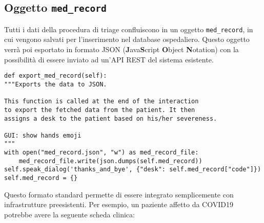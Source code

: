 \subsection{Oggetto \texttt{med\_record}}
Tutti i dati della procedura di triage confluiscono in un oggetto \texttt{med\_record}, in cui vengono salvati per l'inserimento nel database ospedaliero. Questo oggetto verrà poi esportato in formato JSON (\textbf{J}ava\textbf{S}cript \textbf{O}bject \textbf{N}otation) con la possibilità di essere inviato ad un'API REST del sistema esistente.
\begin{verbatim}
def export_med_record(self):
"""Exports the data to JSON.

This function is called at the end of the interaction
to export the fetched data from the patient. It then
assigns a desk to the patient based on his/her severeness.

GUI: show hands emoji
"""
with open("med_record.json", "w") as med_record_file:
    med_record_file.write(json.dumps(self.med_record))
self.speak_dialog('thanks_and_bye', {"desk": self.med_record["code"]})
self.med_record = {}
\end{verbatim}
Questo formato standard permette di essere integrato semplicemente con infrastrutture preesistenti. Per esempio, un paziente affetto da COVID19 potrebbe avere la seguente scheda clinica:
\inputminted{json}{code/med_record.json}